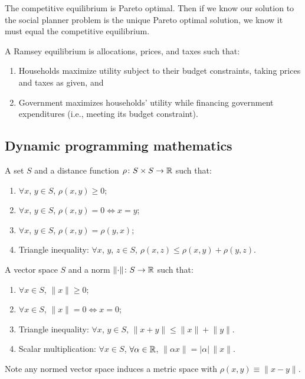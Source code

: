 \documentclass[8pt,letterpaper, landscape]{extarticle} %
\begin{document}
\begin{multicols}{3}
\begin{description}
 The competitive equilibrium is Pareto optimal. Then if we know our solution to the social planner problem is the unique Pareto optimal solution, we know it must equal the competitive equilibrium.

 A Ramsey equilibrium is allocations, prices, and taxes such that:
\begin{enumerate}
\item Households maximize utility subject to their budget constraints, taking prices and taxes as given, and
\item Government maximizes households' utility while financing government expenditures (i.e., meeting its budget constraint).
\end{enumerate}

\subsection{Dynamic programming mathematics}
 A set $ S $ and a distance function $ \rho \colon S \times S \to \mathbb{R} $ such that:
\begin{enumerate}
\item $ \forall x $, $ y \in S $, $ \rho(x, y) \geq 0 $;
\item $ \forall x $, $ y \in S $, $ \rho(x, y) = 0 \iff x = y $;
\item $ \forall x $, $ y \in S $, $ \rho(x, y) = \rho (y,x) $;
\item Triangle inequality: $ \forall x $, $ y $, $ z \in S $, $ \rho(x, z) \leq \rho (x,y) +  \rho (y,z) $.
\end{enumerate}

 A vector space $ S $ and a norm $ \lVert \cdot \rVert \colon S \to \mathbb{R} $ such that:
\begin{enumerate}
\item $ \forall x \in S $, $ \lVert x \rVert \geq 0 $;
\item $ \forall x \in S $, $ \lVert x \rVert = 0 \iff x = 0 $;
\item Triangle inequality: $ \forall x $, $ y \in S $, $ \lVert x + y \rVert \leq \lVert x \rVert + \lVert y \rVert $.
\item Scalar multiplication: $ \forall x \in S $, $ \forall \alpha \in \mathbb{R} $, $ \lVert \alpha x \rVert = | \alpha | \, \lVert x \rVert $.
\end{enumerate}
Note any normed vector space induces a metric space with $ \rho (x, y) \equiv \lVert x - y \rVert $.


\end{description}
\end{multicols}
\end{document}
